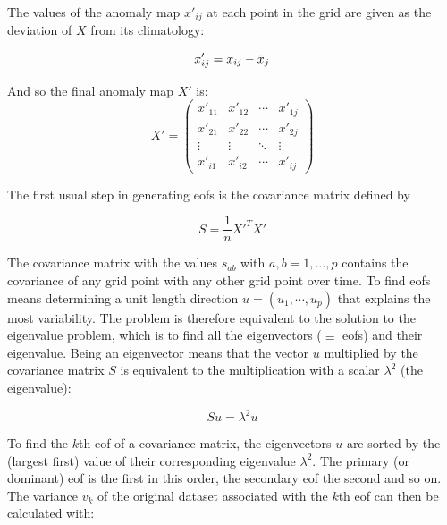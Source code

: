 The values of the anomaly map $x'_{ij}$ at each point in the grid are given as the deviation of $X$ from its climatology: 



\begin{equation}
  x'_{ij} = x_{ij} - \bar{x}_j \\
  \label{eq:anomaly map elements}
\end{equation}

And so the final anomaly map $X'$ is: 
\begin{equation}
  X' = \begin{pmatrix}
x'_{11} & x'_{12} & \cdots & x'_{1j} \\
x'_{21} & x'_{22} & \cdots & x'_{2j} \\
\vdots & \vdots & \ddots & \vdots \\
x'_{i1} & x'_{i2} & \cdots & x'_{ij}
\end{pmatrix}
  \label{eq:anomaly map}
\end{equation}

The first usual step in generating \acp{eof} is the covariance matrix defined by 

\begin{equation}
  S = \frac{1}{n} X'^T X' 
  \label{eq:covariance map}
\end{equation}

The covariance matrix with the values $s_{ab}$ with $a,b = 1, \dots, p$ contains the covariance of any grid point with any other grid point over time. 
To find \acp{eof} means determining a unit length direction $u = (u_1, \cdots, u_p)$ that explains the most variability. 
The problem is therefore equivalent to the solution to the eigenvalue problem, which is to find all the eigenvectors ($\equiv$ \acp{eof}) and their eigenvalue. Being an eigenvector means that the vector $u$ multiplied by the covariance matrix $S$ is equivalent to the multiplication with a scalar $\lambda^2$ (the eigenvalue):  

\begin{equation}
  Su = \lambda^2 u
  \label{eq:eigenvalue problem} 
\end{equation}

To find the $k$th \ac{eof} of a covariance matrix, the eigenvectors $u$ are sorted by the (largest first) value of their corresponding eigenvalue $\lambda^2$. 
The primary (or dominant) \ac{eof} is the first in this order, the secondary \ac{eof} the second and so on. 
The variance $v_k$ of the original dataset associated with the $k$th \ac{eof} can then be calculated with: 

